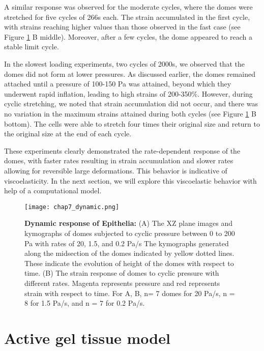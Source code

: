 A similar response was observed for the moderate cycles, where the domes were stretched for five cycles of 266s each. The strain accumulated in the first cycle, with strains reaching higher values than those observed in the fast case (see Figure \ref{fig_7_6} B middle). Moreover, after a few cycles, the dome appeared to reach a stable limit cycle.

In the slowest loading experiments, two cycles of 2000s, we observed that the domes did not form at lower pressures. As discussed earlier, the domes remained attached until a pressure of 100-150 Pa was attained, beyond which they underwent rapid inflation, leading to high strains of 200-350\%. However, during cyclic stretching, we noted that strain accumulation did not occur, and there was no variation in the maximum strains attained during both cycles (see Figure \ref{fig_7_6} B bottom). The cells were able to stretch four times their original size and return to the original size at the end of each cycle.

These experiments clearly demonstrated the rate-dependent response of the domes, with faster rates resulting in strain accumulation and slower rates allowing for reversible large deformations. This behavior is indicative of viscoelasticity. In the next section, we will explore this viscoelastic behavior with help of a computational model.

\begin{figure}[]
	\centering
	\texttt{[image: chap7\_dynamic.png]}
	\caption{\label{fig_7_6} \textbf{Dynamic response of Epithelia:} (A) The XZ plane images and kymographs of domes subjected to cyclic pressure between 0 to 200 Pa with rates of 20, 1.5, and 0.2 Pa/s The kymographs generated along the midsection of the domes indicated by yellow dotted lines. These indicate the evolution of height of the domes with respect to time. (B) The strain response of domes to cyclic pressure with different rates. Magenta represents pressure and red represents strain with respect to time. For A, B, n= 7 domes for 20 Pa/s, n = 8 for 1.5 Pa/s, and n = 7 for 0.2 Pa/s. 
	}
\end{figure}

\newpage

\hypertarget{active-gel-tissue-model}{%
	\section{Active gel tissue model}\label{active-gel-tissue-model}}

